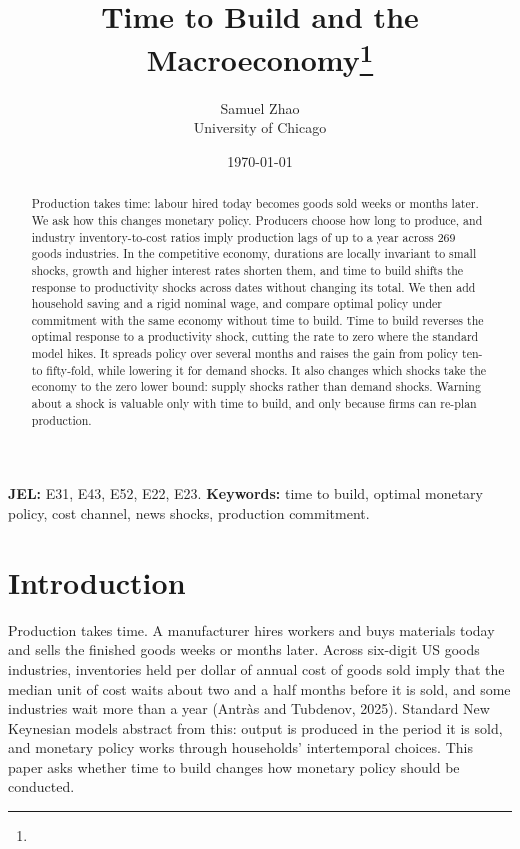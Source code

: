 \documentclass[11pt]{article}
\title{Time to Build and the Macroeconomy\thanks{\todo{acknowledgements}}}
\author{Samuel Zhao\\University of Chicago}
\date{\today}
\theoremstyle{definition}
\begin{document}
\maketitle

\begin{abstract}
\noindent
Production takes time: labour hired today becomes goods sold weeks or months later. We ask how this
changes monetary policy. Producers choose how long to produce, and industry inventory-to-cost
ratios imply production lags of up to a year across 269 goods industries. In the competitive economy,
durations are locally invariant to small shocks, growth and higher interest rates shorten them,
and time to build shifts the response to productivity shocks across dates without changing its
total. We then add household saving and a rigid nominal wage, and compare optimal policy under
commitment with the same economy without time to build. Time to build reverses the optimal response
to a productivity shock, cutting the rate to zero where the standard model hikes. It spreads policy
over several months and raises the gain from policy ten- to fifty-fold, while lowering it for demand
shocks. It also changes which shocks take the economy to the zero lower bound: supply shocks rather
than demand shocks. Warning about a shock is valuable only with time to build, and only because firms
can re-plan production.
\end{abstract}

\noindent\textbf{JEL:} E31, E43, E52, E22, E23.\quad
\textbf{Keywords:} time to build, optimal monetary policy, cost channel, news shocks, production commitment.

\newpage
\section{Introduction}\label{sec:intro}

Production takes time. A manufacturer hires workers and buys materials today and sells the
finished goods weeks or months later. Across six-digit US goods industries, inventories held per
dollar of annual cost of goods sold imply that the median unit of cost waits about two and a half
months before it is sold, and some industries wait more than a year (Antr\`as and Tubdenov, 2025).
Standard New Keynesian models abstract from this: output is produced in the period it is sold, and
monetary policy works through households' intertemporal choices. This paper asks whether time to
build changes how monetary policy should be conducted.
\end{document}
